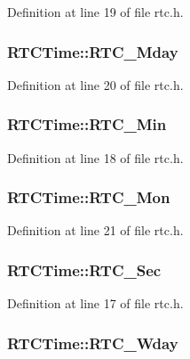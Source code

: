 Definition at line 19 of file rtc.h.

\hypertarget{struct_r_t_c_time_a5077e93b31e29a15d1f0d8191b9e9ea9}{
\subsubsection[{RTC\_\-Mday}]{ {\bf RTCTime::RTC\_\-Mday}}}
\label{struct_r_t_c_time_a5077e93b31e29a15d1f0d8191b9e9ea9}


Definition at line 20 of file rtc.h.

\hypertarget{struct_r_t_c_time_aa9c8cd2d54685a9c6aa7093d0e6cd1dd}{
\subsubsection[{RTC\_\-Min}]{ {\bf RTCTime::RTC\_\-Min}}}
\label{struct_r_t_c_time_aa9c8cd2d54685a9c6aa7093d0e6cd1dd}


Definition at line 18 of file rtc.h.

\hypertarget{struct_r_t_c_time_ac01f07a46c73b86011342b90b8c1100a}{
\subsubsection[{RTC\_\-Mon}]{ {\bf RTCTime::RTC\_\-Mon}}}
\label{struct_r_t_c_time_ac01f07a46c73b86011342b90b8c1100a}


Definition at line 21 of file rtc.h.

\hypertarget{struct_r_t_c_time_ab14ec114407f3361087624eea5d43c19}{
\subsubsection[{RTC\_\-Sec}]{ {\bf RTCTime::RTC\_\-Sec}}}
\label{struct_r_t_c_time_ab14ec114407f3361087624eea5d43c19}


Definition at line 17 of file rtc.h.

\hypertarget{struct_r_t_c_time_a4f063d5cc84028b06d4cdac73e0d74c9}{
\subsubsection[{RTC\_\-Wday}]{ {\bf RTCTime::RTC\_\-Wday}}}
\label{struct_r_t_c_time_a4f063d5cc84028b06d4cdac73e0d74c9}


